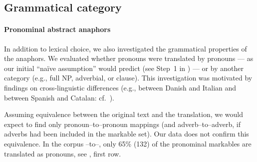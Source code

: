 \documentclass[output=paper]{LSP/langsci}
\begin{document}



\subsection{Grammatical category}
\label{sec:cat}
\paragraph*{Pronominal abstract anaphors}

In addition to lexical choice, we also investigated the grammatical properties of the anaphors. We evaluated whether pronouns were translated by pronouns --- as our initial ``na\"ive assumption'' would predict (see Step~1 in ) --- or by another category  (e.g., full NP, adverbial, or clause). This  investigation was  motivated by findings on cross-linguistic differences (e.g., between Danish and Italian and between Spanish and Catalan:  cf.~\citealt{recasens08,navarretta08,navarretta+olsen08}).

 Assuming equivalence between the original text and the translation, we would expect to find only  pronoun--to--pronoun mappings (and adverb--to--adverb, if adverbs had been included in the markable set). Our data does not confirm this equivalence. In the corpus \DEo--to--\ENt, only 65\% (132) of the pronominal markables are translated as pronouns, see , first row.
\end{document}
